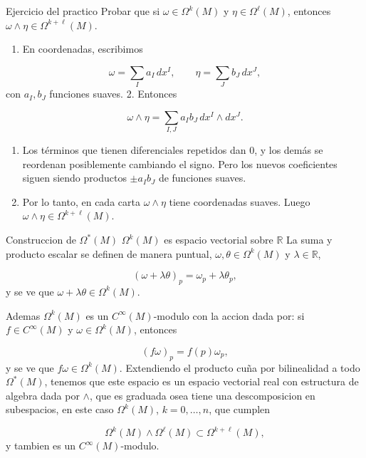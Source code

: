 \begin{bookproposition}{Ejercicio del practico}
Probar que si $\omega\in\Omega^k(M)$ y $\eta\in\Omega^\ell(M)$, entonces $\omega\wedge\eta\in\Omega^{k+\ell}(M)$.

\end{bookproposition}
\begin{bookproof}{}
\begin{enumerate}
\item En coordenadas, escribimos
\end{enumerate}
\[
\omega=\sum_I a_I\,dx^I,\qquad \eta=\sum_J b_J\,dx^J,
\]
con $a_I,b_J$ funciones suaves. 2. Entonces

\[
\omega\wedge\eta=\sum_{I,J}a_Ib_J\,dx^I\wedge dx^J.
\]
\begin{enumerate}[start=3]
\item Los términos que tienen diferenciales repetidos dan $0$, y los demás se reordenan posiblemente cambiando el signo. Pero los nuevos coeficientes siguen siendo productos $\pm a_Ib_J$ de funciones suaves.
\item Por lo tanto, en cada carta $\omega\wedge\eta$ tiene coordenadas suaves. Luego $\omega\wedge\eta\in\Omega^{k+\ell}(M)$.
\end{enumerate}
\bookqed
\end{bookproof}
\label{blk:ce25ad}
\begin{bookdefinition}{Construccion de $\Omega^{*}(M)$}
$\Omega^{k}(M)$ es espacio vectorial sobre $\mathbb{R}$ La suma y producto escalar se definen de manera puntual, $\omega,\theta\in\Omega^k(M)$ y $\lambda\in\mathbb R$,

\[
(\omega+\lambda\theta)_p=\omega_p+\lambda\theta_p,
\]
y se ve que $\omega+\lambda\theta\in\Omega^k(M)$.

Ademas $\Omega^k(M)$ es un $C^\infty(M)$-modulo con la accion dada por: si $f\in C^\infty(M)$ y $\omega\in\Omega^k(M)$, entonces

\[
(f\omega)_p=f(p)\omega_p,
\]
y se ve que $f\omega\in\Omega^k(M)$. Extendiendo el producto cuña por bilinealidad a todo $\Omega^*(M)$, tenemos que este espacio es un espacio vectorial real con estructura de algebra dada por $\wedge$, que es graduada osea tiene una descomposicion en subespacios, en este caso $\Omega^k(M)$, $k=0,\ldots,n$, que cumplen

\[
\Omega^k(M)\wedge\Omega^\ell(M)\subset\Omega^{k+\ell}(M),
\]
y tambien es un $C^\infty(M)$-modulo.

\end{bookdefinition}
\label{blk:76ed6d}
